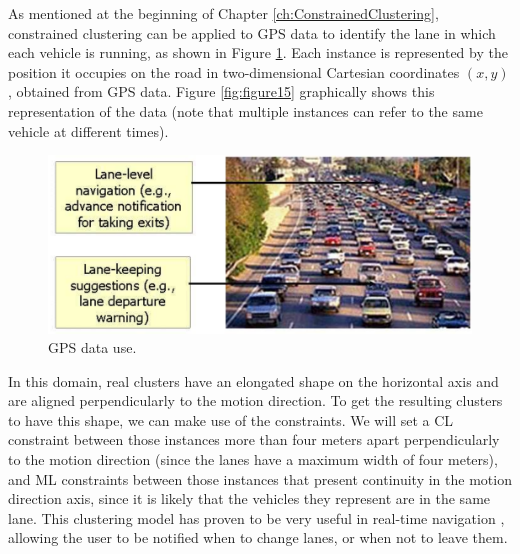 As mentioned at the beginning of Chapter \ref{ch:ConstrainedClustering}, constrained clustering can be applied to \acs{GPS} data to identify the lane in which each vehicle is running, as shown in Figure \ref{fig:GPSClustData}. Each instance is represented by the position it occupies on the road in two-dimensional Cartesian coordinates $(x,y)$, obtained from \acs{GPS} data. Figure \ref{fig:figure15} graphically shows this representation of the data (note that multiple instances can refer to the same vehicle at different times).

\begin{figure}[!h]
	\centering
	\includegraphics[scale=0.3]{gfx/ConstClust/GPS/Coches} 
	\caption[GPS data use.]{\acs{GPS} data use. \cite{davidson2007survey} \cite{wagstaff2001constrained}}\label{fig:GPSClustData}
\end{figure}


In this domain, real clusters have an elongated shape on the horizontal axis and are aligned perpendicularly to the motion direction. To get the resulting clusters to have this shape, we can make use of the constraints. We will set a \acs{CL} constraint between those instances more than four meters apart perpendicularly to the motion direction (since the lanes have a maximum width of four meters), and \acs{ML} constraints between those instances that present continuity in the motion direction axis, since it is likely that the vehicles they represent are in the same lane. This clustering model has proven to be very useful in real-time navigation \cite{wagstaff2001constrained}, allowing the user to be notified when to change lanes, or when not to leave them.


